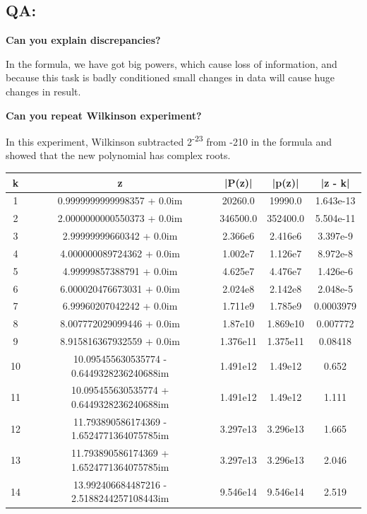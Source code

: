 \documentclass{article}
\begin{document}
    \subsection*{QA:}
\begin{center}
    \textbf{Can you explain discrepancies?}
\end{center}
In the formula, we have got big powers, which cause loss of information, and because this task is badly conditioned small changes in data will cause huge changes in result.
\newpage
\begin{center}
    \textbf{Can you repeat Wilkinson experiment?}
\end{center}
In this experiment, Wilkinson subtracted 2\textsuperscript{-23} from -210 in the formula and showed that the new polynomial has complex roots.

\begin{center}
    \begin{tabular}{| c | c | c | c | c |}
        \hline
        k & z & |P(z)| & |p(z)| & |z - k|\\
        \hline
        1 & 0.9999999999998357 + 0.0im & 20260.0 & 19990.0 & 1.643e-13\\
2 & 2.0000000000550373 + 0.0im & 346500.0 & 352400.0 & 5.504e-11\\
3 & 2.99999999660342 + 0.0im & 2.366e6 & 2.416e6 & 3.397e-9\\
4 & 4.000000089724362 + 0.0im & 1.002e7 & 1.126e7 & 8.972e-8\\
5 & 4.99999857388791 + 0.0im & 4.625e7 & 4.476e7 & 1.426e-6\\
6 & 6.000020476673031 + 0.0im & 2.024e8 & 2.142e8 & 2.048e-5\\
7 & 6.99960207042242 + 0.0im & 1.711e9 & 1.785e9 & 0.0003979\\
8 & 8.007772029099446 + 0.0im & 1.87e10 & 1.869e10 & 0.007772\\
9 & 8.915816367932559 + 0.0im & 1.376e11 & 1.375e11 & 0.08418\\
10 & 10.095455630535774 - 0.6449328236240688im & 1.491e12 & 1.49e12 & 0.652\\
11 & 10.095455630535774 + 0.6449328236240688im & 1.491e12 & 1.49e12 & 1.111\\
12 & 11.793890586174369 - 1.6524771364075785im & 3.297e13 & 3.296e13 & 1.665\\
13 & 11.793890586174369 + 1.6524771364075785im & 3.297e13 & 3.296e13 & 2.046\\
14 & 13.992406684487216 - 2.5188244257108443im & 9.546e14 & 9.546e14 & 2.519\\

\end{tabular}
\end{center}
\end{document}
